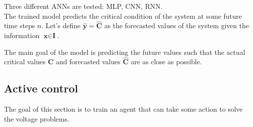 Three different \glspl{ANN} are tested: MLP, CNN, RNN.\\

The trained model predicts the critical condition of the system at some future time steps $n$. Let's define $\hat{\textbf{y}} = \hat{\textbf{C}}$ as the forecasted values of the system given the information $\textbf{x} \in \textbf{I}$. 

The main goal of the model is predicting the future values such that the actual critical values $\textbf{C}$ and forecasted values $\hat{\textbf{C}}$ are as close as possible.


\subsection{Active control}
The goal of this section is to train an agent that can take some action to solve the voltage problems.\\

